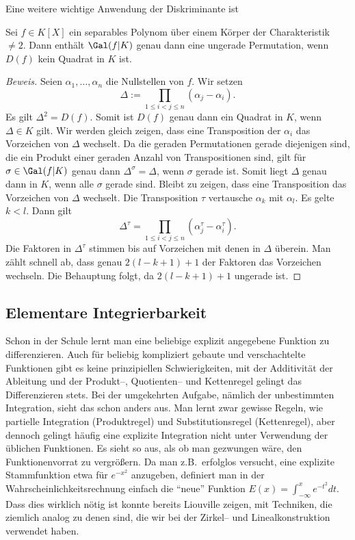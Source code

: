 \documentclass[12pt,a4paper,twoside]{article}
\begin{document}
Eine weitere wichtige Anwendung der Diskriminante ist
\begin{Satz}
  Sei $f\in K[X]$ ein separables Polynom \"uber einem K\"orper der
  Charakteristik $\ne2$. Dann enth\"alt $\Gal(f|K)$ genau dann eine ungerade
  Permutation, wenn $D(f)$ kein Quadrat in $K$ ist.
\end{Satz}
\begin{proof}[Beweis]
  Seien $\alpha_1,\dots,\alpha_n$ die Nullstellen von $f$. Wir setzen
\[
\Delta:=\prod_{1\le i<j\le n}(\alpha_j-\alpha_i).
\]
Es gilt $\Delta^2=D(f)$. Somit ist $D(f)$ genau dann ein Quadrat in $K$, wenn
$\Delta\in K$ gilt. Wir werden gleich zeigen, dass eine Transposition der
$\alpha_i$ das Vorzeichen von $\Delta$ wechselt. Da die geraden Permutationen
gerade diejenigen sind, die ein Produkt einer geraden Anzahl von
Transpositionen sind, gilt f\"ur $\sigma\in\Gal(f|K)$ genau dann
$\Delta^\sigma=\Delta$, wenn $\sigma$ gerade ist. Somit liegt $\Delta$ genau
dann in $K$, wenn alle $\sigma$ gerade sind. Bleibt zu zeigen, dass eine
Transposition das Vorzeichen von $\Delta$ wechselt. Die Transposition $\tau$
vertausche $\alpha_k$ mit $\alpha_l$. Es gelte $k<l$. Dann gilt
\[
\Delta^\tau = \prod_{1\le i<j\le n}(\alpha_j^\tau-\alpha_i^\tau).
\]
Die Faktoren in $\Delta^\tau$ stimmen bis auf Vorzeichen mit denen in $\Delta$
\"uberein. Man z\"ahlt schnell ab, dass genau $2(l-k+1)+1$ der Faktoren das
Vorzeichen wechseln. Die Behauptung folgt, da $2(l-k+1)+1$ ungerade ist.
\end{proof}
\subsection{Elementare Integrierbarkeit}
Schon in der Schule lernt man eine beliebige explizit angegebene Funktion zu
differenzieren. Auch f\"ur beliebig kompliziert gebaute und verschachtelte
Funktionen gibt es keine prinzipiellen Schwierigkeiten, mit der Additivit\"at
der Ableitung und der Produkt--, Quotienten-- und Kettenregel gelingt das
Differenzieren stets. Bei der umgekehrten Aufgabe, n\"amlich der unbestimmten
Integration, sieht das schon anders aus. Man lernt zwar gewisse Regeln, wie
partielle Integration (Produktregel) und Substitutionsregel (Kettenregel),
aber dennoch gelingt h\"aufig eine explizite Integration nicht unter
Verwendung der \"ublichen Funktionen. Es sieht so aus, als ob man gezwungen
w\"are, den Funktionenvorrat zu vergr\"o\ss ern. Da man z.B.\ erfolglos
versucht, eine explizite Stammfunktion etwa f\"ur $e^{-x^2}$ anzugeben,
definiert man in der Wahrscheinlichkeitsrechnung einfach die ``neue'' Funktion
$E(x)=\int_{-\infty}^xe^{-t^2}dt$. Dass dies wirklich n\"otig ist konnte
bereits Liouville zeigen, mit Techniken, die ziemlich analog zu denen sind,
die wir bei der Zirkel-- und Linealkonstruktion verwendet haben.
\end{document}
